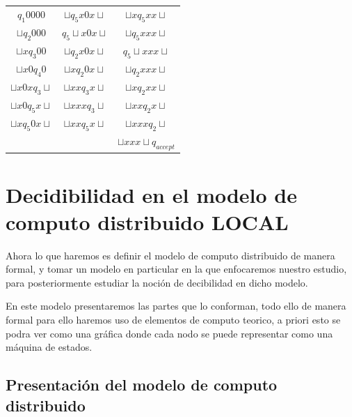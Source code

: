 \documentclass[10pt]{report}
\begin{document}
{    \begin{center}
        \begin{tabular}{c c c}
            $q_{1}0000$ &     $\sqcup q_{5}x0x\sqcup$ & $\sqcup xq_{5}xx\sqcup$ \\
            $\sqcup q_{2}000$ & $q_{5}\sqcup x0x\sqcup$ & $\sqcup q_{5}xxx\sqcup$\\
            $\sqcup xq_{3}00$ & $\sqcup q_{2}x0x\sqcup$ & $q_{5}\sqcup xxx\sqcup$\\
            $\sqcup x0q_{4}0$  & $\sqcup xq_{2}0x\sqcup$ &   $\sqcup q_{2}xxx\sqcup$\\
            $\sqcup x0xq_{3}\sqcup$ & $\sqcup xxq_{3}x\sqcup$ & $\sqcup xq_{2}xx\sqcup$ \\
            $\sqcup x0q_{5}x\sqcup$ & $\sqcup xxxq_{3}\sqcup$ & $\sqcup xxq_{2}x\sqcup$ \\
            $\sqcup xq_{5}0x\sqcup$ & $\sqcup xxq_{5}x\sqcup$ & $\sqcup xxxq_{2}\sqcup$ \\
                            &                                 & $\sqcup xxx\sqcup q_{accept}$ \\
        \end{tabular}
    \end{center}


    \section{Decidibilidad en el modelo de computo distribuido  \textbf{LOCAL}}\label{sec:decidibilidad-en-el-modelo-de-computo-distribuidotextbf}
    Ahora lo que haremos es definir el modelo de computo distribuido de manera formal,
    y tomar un modelo en particular en la que enfocaremos nuestro estudio, para posteriormente
    estudiar la noción de decibilidad en dicho modelo.\newline

    En este modelo presentaremos las partes que lo conforman, todo ello de manera formal para ello
    haremos uso de elementos de computo teorico, a priori esto se podra ver como una gráfica donde cada
    nodo se puede representar como una máquina de estados.



    \subsection{Presentación del modelo de computo distribuido}\label{subsec:presentación-del-modelo-de-computo-distribuido}
}
\end{document}
